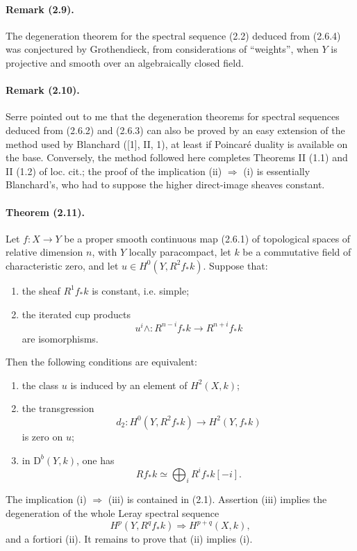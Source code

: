 \documentclass[10pt]{article}
\providecommand{\D}{\mathrm D}
\begin{document}
\paragraph{Remark (2.9).} The degeneration theorem for the spectral sequence (2.2) deduced from (2.6.4) was conjectured by Grothendieck, from considerations of ``weights'', when $Y$ is projective and smooth over an algebraically closed field.

\paragraph{Remark (2.10).} Serre pointed out to me that the degeneration theorems for spectral sequences deduced from (2.6.2) and (2.6.3) can also be proved by an easy extension of the method used by Blanchard ([1], II, 1), at least if Poincaré duality is available on the base. Conversely, the method followed here completes Theorems II (1.1) and II (1.2) of loc. cit.; the proof of the implication (ii) $\Rightarrow$ (i) is essentially Blanchard's, who had to suppose the higher direct-image sheaves constant.

\paragraph{Theorem (2.11).} Let $f:X\to Y$ be a proper smooth continuous map (2.6.1) of topological spaces of relative dimension $n$, with $Y$ locally paracompact, let $k$ be a commutative field of characteristic zero, and let $u\in H^0(Y,R^2f_*k)$. Suppose that:
\begin{enumerate}[label=\alph*)]
\item the sheaf $R^1f_*k$ is constant, i.e. simple;
\item the iterated cup products
\[
 u^i\wedge:R^{n-i}f_*k\longrightarrow R^{n+i}f_*k
\]
are isomorphisms.
\end{enumerate}
Then the following conditions are equivalent:
\begin{enumerate}[label=(\roman*)]
\item the class $u$ is induced by an element of $H^2(X,k)$;
\item the transgression
\[
d_2:H^0(Y,R^2f_*k)\longrightarrow H^2(Y,f_*k)
\]
is zero on $u$;
\item in $\D^b(Y,k)$, one has
\[
Rf_*k\simeq\bigoplus_iR^if_*k[-i].
\]
\end{enumerate}
The implication (i) $\Rightarrow$ (iii) is contained in (2.1). Assertion (iii) implies the degeneration of the whole Leray spectral sequence
\[
\tag{2.12}
H^p(Y,R^qf_*k)\Longrightarrow H^{p+q}(X,k),
\]
and a fortiori (ii). It remains to prove that (ii) implies (i).
\end{document}

